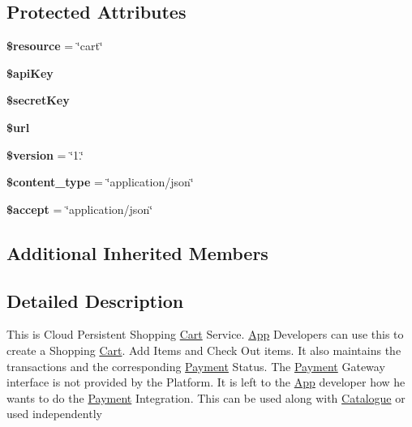 \subsection*{Protected Attributes}
\begin{DoxyCompactItemize}
\item 
\hypertarget{class_cart_service_abd4c7b8b084214b8d2533ba07fce6b83}{{\bfseries \$resource} = \char`\"{}cart\char`\"{}}\label{class_cart_service_abd4c7b8b084214b8d2533ba07fce6b83}

\item 
\hypertarget{class_cart_service_a084e3db37d1b117a3cc7212cf2eed533}{{\bfseries \$api\+Key}}\label{class_cart_service_a084e3db37d1b117a3cc7212cf2eed533}

\item 
\hypertarget{class_cart_service_a766bfb236de2f29a3680976ca22790d4}{{\bfseries \$secret\+Key}}\label{class_cart_service_a766bfb236de2f29a3680976ca22790d4}

\item 
\hypertarget{class_cart_service_acf215f34a917d014776ce684a9ee8909}{{\bfseries \$url}}\label{class_cart_service_acf215f34a917d014776ce684a9ee8909}

\item 
\hypertarget{class_cart_service_a17c8948c68aa44fa9961ae169b6a8961}{{\bfseries \$version} = \char`\"{}1.\char`\"{}}\label{class_cart_service_a17c8948c68aa44fa9961ae169b6a8961}

\item 
\hypertarget{class_cart_service_ae754d6373f275e781f47c8bc9b994b6d}{{\bfseries \$content\+\_\+type} = \char`\"{}application/json\char`\"{}}\label{class_cart_service_ae754d6373f275e781f47c8bc9b994b6d}

\item 
\hypertarget{class_cart_service_a75fc18c4ff06288ff9fdf8aba9bd1081}{{\bfseries \$accept} = \char`\"{}application/json\char`\"{}}\label{class_cart_service_a75fc18c4ff06288ff9fdf8aba9bd1081}

\end{DoxyCompactItemize}
\subsection*{Additional Inherited Members}


\subsection{Detailed Description}
This is Cloud Persistent Shopping \hyperlink{class_cart}{Cart} Service. \hyperlink{class_app}{App} Developers can use this to create a Shopping \hyperlink{class_cart}{Cart}. Add Items and Check Out items. It also maintains the transactions and the corresponding \hyperlink{class_payment}{Payment} Status. The \hyperlink{class_payment}{Payment} Gateway interface is not provided by the Platform. It is left to the \hyperlink{class_app}{App} developer how he wants to do the \hyperlink{class_payment}{Payment} Integration. This can be used along with \hyperlink{class_catalogue}{Catalogue} or used independently


